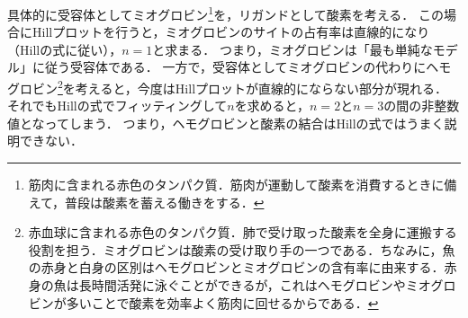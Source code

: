 具体的に受容体としてミオグロビン\footnote{筋肉に含まれる赤色のタンパク質．筋肉が運動して酸素を消費するときに備えて，普段は酸素を蓄える働きをする．}を，リガンドとして酸素を考える．
この場合にHillプロットを行うと，ミオグロビンのサイトの占有率は直線的になり（Hillの式に従い），$n=1$と求まる．
つまり，ミオグロビンは「最も単純なモデル」に従う受容体である．
一方で，受容体としてミオグロビンの代わりにヘモグロビン\footnote{赤血球に含まれる赤色のタンパク質．肺で受け取った酸素を全身に運搬する役割を担う．ミオグロビンは酸素の受け取り手の一つである．ちなみに，魚の赤身と白身の区別はヘモグロビンとミオグロビンの含有率に由来する．赤身の魚は長時間活発に泳ぐことができるが，これはヘモグロビンやミオグロビンが多いことで酸素を効率よく筋肉に回せるからである\cite{akami}．}を考えると，今度はHillプロットが直線的にならない部分が現れる．
それでもHillの式でフィッティングして$n$を求めると，$n=2$と$n=3$の間の非整数値となってしまう．
つまり，ヘモグロビンと酸素の結合はHillの式ではうまく説明できない．